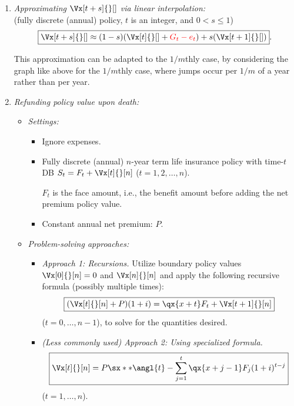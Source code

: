 \begin{enumerate}
\begin{enumerate}[label={(\arabic*)}]
\item \emph{Approximating \(\Vx[t+s]{}[]\) via linear interpolation:} \\
(fully discrete (annual) policy, \(t\) is an integer, and \(0<s\le 1\))
\[
\boxed{\Vx[t+s]{}[]\approx (1-s)(\Vx[t]{}[]+\rc{G_t-e_t})+s(\Vx[t+1]{}[])}.
\]
\begin{center}
\end{center}
\begin{note}
This approximation can be adapted to the \(1/m\)thly case, by considering the
graph like above for the \(1/m\)thly case, where jumps occur per \(1/m\) of a
year rather than per year.
\end{note}
\item \emph{Refunding policy value upon death:}
\begin{itemize}
\item \emph{Settings:}
\begin{itemize}
\item Ignore expenses.
\item Fully discrete (annual) \(n\)-year term life insurance policy with
time-\(t\) DB \(S_t=F_t+\Vx[t]{}[n]\) (\(t=1,2,\dotsc,n\)).
\begin{note}
\(F_t\) is the face amount, i.e., the benefit amount before adding the net
premium policy value.
\end{note}
\item Constant annual net premium: \(P\).
\end{itemize}
\item \emph{Problem-solving approaches:}
\begin{itemize}
\item \emph{Approach 1: Recursions.} Utilize boundary policy values
\(\Vx[0]{}[n]=0\) and \(\Vx[n]{}[n]\) and apply the following recursive formula
(possibly multiple times):
\[
\boxed{(\Vx[t]{}[n]+P)(1+i)=\qx{x+t}F_{t}+\Vx[t+1]{}[n]}
\]
(\(t=0,\dotsc,n-1\)), to solve for the quantities desired.
\item \emph{(Less commonly used) Approach 2: Using specialized formula.}
\[
\boxed{\Vx[t]{}[n]=P\sx**{\angl{t}}-\sum_{j=1}^{t}\qx{x+j-1}F_{j}(1+i)^{t-j}}
\]
(\(t=1,\dotsc,n\)).


\end{itemize}
\end{itemize}
\end{enumerate}
\end{enumerate}

